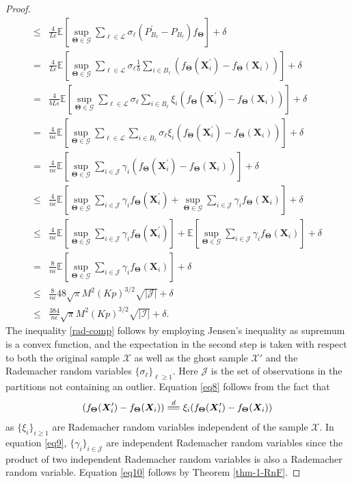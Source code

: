 \documentclass[12pt]{article}
\newcommand{\bX}{\boldsymbol{X}}
\newcommand{\bTheta}{\boldsymbol{\Theta}}
\newcommand{\I}{\mathcal{I}}
\newcommand{\E}{\mathbb{E}}
\newcommand{\J}{\mathcal{J}}
\newcommand{\cL}{\mathcal{L}}
\begin{document}
\begin{proof}
\begin{align}
     \le & \frac{4}{L \epsilon}\E\left[\sup_{\bTheta \in \mathscr{G}}\sum_{\ell \in \cL}\sigma_\ell  (P^\prime_{B_\ell}-P_{B_\ell})f_{\bTheta} \right]+ \delta \label{rad-comp} \\
     = & \frac{4}{L \epsilon}\E\left[\sup_{\bTheta \in \mathscr{G}}\sum_{\ell \in \cL}\sigma_\ell  \frac{1}{b}\sum_{i \in B_\ell}(f_{\bTheta}(\bX_i^\prime)-f_{\bTheta}(\bX_i)) \right]+ \delta \nonumber \\
     = & \frac{4}{b L \epsilon}\E\left[\sup_{\bTheta \in \mathscr{G}}\sum_{\ell \in \cL}\sigma_\ell  \sum_{i \in B_\ell} \xi_i(f_{\bTheta}(\bX_i^\prime)-f_{\bTheta}(\bX_i)) \right]+ \delta \label{eq8} \\
     = & \frac{4}{n \epsilon}\E\left[\sup_{\bTheta \in \mathscr{G}}\sum_{\ell \in \cL}  \sum_{i \in B_\ell} \sigma_\ell \xi_i(f_{\bTheta}(\bX_i^\prime)-f_{\bTheta}(\bX_i)) \right]+ \delta \nonumber \\
     = & \frac{4}{n \epsilon}\E\left[\sup_{\bTheta \in \mathscr{G}} \sum_{i \in \J} \gamma_i (f_{\bTheta}(\bX_i^\prime)-f_{\bTheta}(\bX_i)) \right]+ \delta \label{eq9} \\
     \le &  \frac{4}{n \epsilon}\E\left[\sup_{\bTheta \in \mathscr{G}} \sum_{i \in \J} \gamma_i f_{\bTheta}(\bX_i^\prime)+ \sup_{\bTheta \in \mathscr{G}} \sum_{i \in \J} \gamma_i f_{\bTheta}(\bX_i) \right]+ \delta\\
     \le & \frac{4}{n \epsilon}\E\left[\sup_{\bTheta \in \mathscr{G}} \sum_{i \in \J} \gamma_i f_{\bTheta}(\bX_i^\prime)\right]+\E\left[ \sup_{\bTheta \in \mathscr{G}} \sum_{i \in \J} \gamma_i f_{\bTheta}(\bX_i) \right]+ \delta\\
     = & \frac{8}{n \epsilon}\E\left[\sup_{\bTheta \in \mathscr{G}} \sum_{i \in \J} \gamma_i f_{\bTheta}(\bX_i) \right]+ \delta \nonumber \\
     \le & \frac{8}{n \epsilon} 48 \sqrt{\pi}  M^2  (Kp)^{3/2}  \sqrt{|\J|} + \delta \label{eq10} \\
     \le & \frac{384}{n \epsilon}  \sqrt{\pi}  M^2  (Kp)^{3/2} \sqrt{|\I|} + \delta. \label{eq11}
\end{align}
\endgroup
The inequality \eqref{rad-comp} follows by employing Jensen's inequality as supremum is a convex function, and the expectation in the second step is taken with respect to both the original sample $\mathcal{X}$ as well as the ghost sample $\mathcal{X}'$ and the Rademacher random variables $\{\sigma_{\ell}\}_{\ell\ge 1}$.
Here $\J$ is the set of observations in the partitions not containing an outlier. Equation \eqref{eq8} follows from the fact that $$(f_{\bTheta}(\bX_i^\prime)-f_{\bTheta}(\bX_i)) \overset{d}{=\joinrel=} \xi_i(f_{\bTheta}(\bX_i^\prime)-f_{\bTheta}(\bX_i))$$ as $\{\xi_i\}_{i\ge 1}$ are Rademacher random variables independent of the sample $\mathcal{X}$. In equation \eqref{eq9}, $\{\gamma_i\}_{i \in \mathcal{J}}$ are independent Rademacher random variables since the product of two independent Rademacher random variables is also a Rademacher random variable. Equation \eqref{eq10} follows by Theorem \ref{thm-1-RnF}.

\end{proof}
\end{document}
